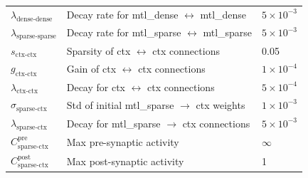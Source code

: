 \documentclass{article}
\begin{document}
\begin{table}[ht]
\begin{tabular}{lll}
$\lambda_{\text{dense-dense}}$ & Decay rate for mtl\_dense $\leftrightarrow$ mtl\_dense & $5 \times 10^{-3}$ \\
$\lambda_{\text{sparse-sparse}}$ & Decay rate for mtl\_sparse $\leftrightarrow$ mtl\_sparse & $5 \times 10^{-3}$ \\

$s_{\text{ctx-ctx}}$ & Sparsity of ctx $\leftrightarrow$ ctx connections & 0.05 \\
$g_{\text{ctx-ctx}}$ & Gain of ctx $\leftrightarrow$ ctx connections & $1 \times 10^{-4}$ \\
$\lambda_{\text{ctx-ctx}}$ & Decay for ctx $\leftrightarrow$ ctx connections & $5 \times 10^{-4}$ \\

$\sigma_{\text{sparse-ctx}}$ & Std of initial mtl\_sparse $\to$ ctx weights & $1 \times 10^{-3}$ \\
$\lambda_{\text{sparse-ctx}}$ & Decay for mtl\_sparse $\to$ ctx connections & $5 \times 10^{-3}$ \\
$C^{\text{pre}}_{\text{sparse-ctx}}$ & Max pre-synaptic activity & $\infty$ \\
$C^{\text{post}}_{\text{sparse-ctx}}$ & Max post-synaptic activity & 1 \\

\bottomrule
\end{tabular}
\end{table}
\end{document}
